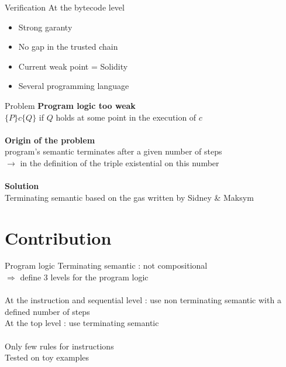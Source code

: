 \documentclass{beamer}
\begin{document}
\begin{frame}{Verification}
	At the bytecode level
	\begin{itemize}
		\item Strong garanty
		\item No gap in the trusted chain
		\item Current weak point = Solidity
		\item Several programming language
	\end{itemize}
\end{frame}

\begin{frame}{Problem}
	\textbf{Program logic too weak}\\
	$\{P\}c\{Q\}$ if $Q$ holds \alert{at some point} in the execution of $c$
	\\~\\
	\textbf{Origin of the problem}\\
	program's semantic terminates after a given number of steps \\
	$\rightarrow$ in the definition of the triple existential on this number
	\\~\\
	\textbf{Solution}\\
	Terminating semantic based on the gas written by Sidney \& Maksym
\end{frame}

\part{Contribution}
\frame{\partpage}

\begin{frame}{Program logic}
	Terminating semantic : not compositional\\
	$\Rightarrow$ define 3 levels for the program logic
	\\~\\
	At the instruction and sequential level : use non terminating semantic with a \alert{defined} number of steps \\
	At the top level : use terminating semantic
	\\~\\
	Only few rules for instructions\\
	Tested on toy examples
\end{frame}
\end{document}
